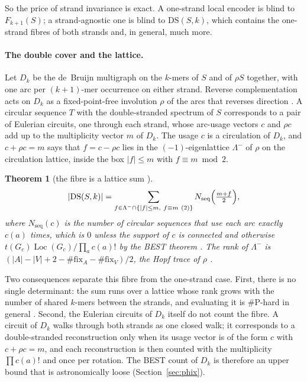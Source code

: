 \documentclass[11pt]{article}
\theoremstyle{plain}
\newtheorem{theorem}{Theorem}
\theoremstyle{definition}
\theoremstyle{remark}
\newcommand{\DS}{\mathrm{DS}}
\begin{document}
So the price of strand invariance is exact. A one-strand local encoder is blind to $F_{k+1}(S)$; a strand-agnostic
one is blind to $\DS(S,k)$, which contains the one-strand fibres of both strands and, in general, much more.

\paragraph{The double cover and the lattice.} Let $D_k$ be the de~Bruijn multigraph on the $k$-mers of $S$ and
of $\rho S$ together, with one arc per $(k+1)$-mer occurrence on either strand. Reverse complementation acts on
$D_k$ as a fixed-point-free involution $\rho$ of the arcs that reverses direction \cite[Ch.~5--6]{AG}. A
circular sequence $T$ with the double-stranded spectrum of $S$ corresponds to a pair of Eulerian circuits, one
through each strand, whose arc-usage vectors $c$ and $\rho c$ add up to the multiplicity vector $m$ of $D_k$. The
usage $c$ is a circulation of $D_k$, and $c+\rho c=m$ says that $f=c-\rho c$ lies in the $(-1)$-eigenlattice
$\Lambda^-$ of $\rho$ on the circulation lattice, inside the box $|f|\le m$ with $f\equiv m\bmod2$.

\begin{theorem}[the fibre is a lattice sum {\cite[Thm.~7.6]{AG}}]\label{thm:lattice}
\[
|\DS(S,k)|=\sum_{f\in\Lambda^-\cap\{|f|\le m,\ f\equiv m\ (2)\}}N_{\mathrm{seq}}\Bigl(\tfrac{m+f}{2}\Bigr),
\]
where $N_{\mathrm{seq}}(c)$ is the number of circular sequences that use each arc exactly $c(a)$ times, which is
$0$ unless the support of $c$ is connected and otherwise $t(G_c)\operatorname{Loc}(G_c)/\prod_ac(a)!$ by the BEST
theorem \cite{BEST}. The rank of $\Lambda^-$ is $(|A|-|V|+2-\#\mathrm{fix}_A-\#\mathrm{fix}_V)/2$, the Hopf trace of
$\rho$ \cite[Ch.~7, check~L]{AG}.
\end{theorem}

Two consequences separate this fibre from the one-strand case. First, there is no single determinant: the
sum runs over a lattice whose rank grows with the number of shared $k$-mers between the strands, and
evaluating it is $\#$P-hard in general \cite[Cor.~10.6]{AG}. Second, the Eulerian circuits of $D_k$ itself do not
count the fibre. A circuit of $D_k$ walks through both strands as one closed walk; it corresponds to a
double-stranded reconstruction only when its usage vector is of the form $c$ with $c+\rho c=m$, and each
reconstruction is then counted with the multiplicity $\prod c(a)!$ and once per rotation. The BEST count of
$D_k$ is therefore an upper bound that is astronomically loose (Section~\ref{sec:phix}).
\end{document}
